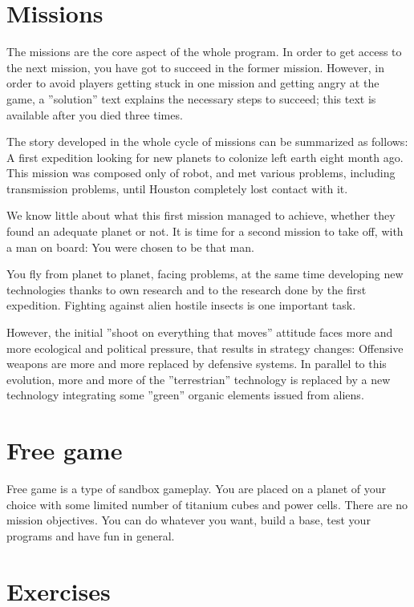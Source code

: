 \chapter{Missions}

The missions are the core aspect of the whole program. In order to get access to the next mission, you have got to succeed in the former mission. However, in order to avoid players getting stuck in one mission and getting angry at the game, a ''solution'' text explains the necessary steps to succeed; this text is available after you died three times.

The story developed in the whole cycle of missions can be summarized as follows: A first expedition looking for new planets to colonize left earth eight month ago. This mission was composed only of robot, and met various problems, including transmission problems, until Houston completely lost contact with it.

We know little about what this first mission managed to achieve, whether they found an adequate planet or not. It is time for a second mission to take off, with a man on board: You were chosen to be that man.

You fly from planet to planet, facing problems, at the same time developing new technologies thanks to own research and to the research done by the first expedition. Fighting against alien hostile insects is one important task.

However, the initial ''shoot on everything that moves'' attitude faces more and more ecological and political pressure, that results in strategy changes: Offensive weapons are more and more replaced by defensive systems. In parallel to this evolution, more and more of the ''terrestrian'' technology is replaced by a new technology integrating some ''green'' organic elements issued from aliens.


\chapter{Free game}


Free game is a type of sandbox gameplay. You are placed on a planet of your choice with some limited number of titanium cubes and power cells. There are no mission objectives. You can do whatever you want, build a base, test your programs and have fun in general.


\chapter{Exercises}

